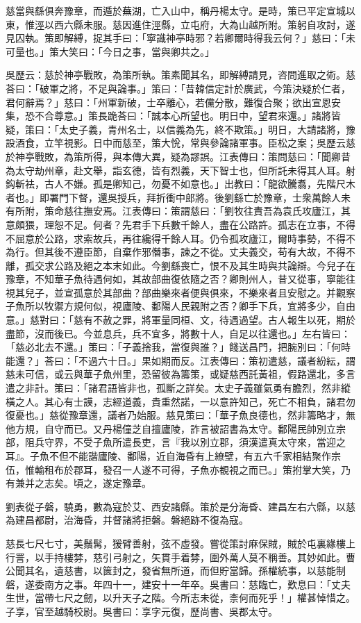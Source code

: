 \begin{pinyinscope}
慈當與繇俱奔豫章，而遁於蕪湖，亡入山中，稱丹楊太守。是時，策已平定宣城以東，惟涇以西六縣未服。慈因進住涇縣，立屯府，大為山越所附。策躬自攻討，遂見囚執。策即解縛，捉其手曰：「寧識神亭時邪？若卿爾時得我云何？」慈曰：「未可量也。」策大笑曰：「今日之事，當與卿共之。」

吳歷云：慈於神亭戰敗，為策所執。策素聞其名，即解縛請見，咨問進取之術。慈荅曰：「破軍之將，不足與論事。」策曰：「昔韓信定計於廣武，今策決疑於仁者，君何辭焉？」慈曰：「州軍新破，士卒離心，若儻分散，難復合聚；欲出宣恩安集，恐不合尊意。」策長跪荅曰：「誠本心所望也。明日中，望君來還。」諸將皆疑，策曰：「太史子義，青州名士，以信義為先，終不欺策。」明日，大請諸將，豫設酒食，立竿視影。日中而慈至，策大恱，常與參論諸軍事。臣松之案；吳歷云慈於神亭戰敗，為策所得，與本傳大異，疑為謬誤。江表傳曰：策問慈曰：「聞卿昔為太守劫州章，赴文舉，詣玄德，皆有烈義，天下智士也，但所託未得其人耳。射鈎斬袪，古人不嫌。孤是卿知己，勿憂不如意也。」出教曰：「龍欲騰翥，先階尺木者也。」即署門下督，還吳授兵，拜折衝中郎將。後劉繇亡於豫章，士衆萬餘人未有所附，策命慈往撫安焉。江表傳曰：策謂慈曰：「劉牧往責吾為袁氏攻廬江，其意頗猥，理恕不足。何者？先君手下兵數千餘人，盡在公路許。孤志在立事，不得不屈意於公路，求索故兵，再往纔得千餘人耳。仍令孤攻廬江，爾時事勢，不得不為行。但其後不遵臣節，自棄作邪僭事，諫之不從。丈夫義交，苟有大故，不得不離，孤交求公路及絕之本末如此。今劉繇喪亡，恨不及其生時與共論辯。今兒子在豫章，不知華子魚待遇何如，其故部曲復依隨之否？卿則州人，昔又從事，寧能往視其兒子，並宣孤意於其部曲？部曲樂來者便與俱來，不樂來者且安慰之。并觀察子魚所以牧禦方規何似，視廬陵、鄱陽人民親附之否？卿手下兵，宜將多少，自由意。」慈對曰：「慈有不赦之罪，將軍量同桓、文，待遇過望。古人報生以死，期於盡節，沒而後已。今並息兵，兵不宜多，將數十人，自足以往還也。」左右皆曰：「慈必北去不還。」策曰：「子義捨我，當復與誰？」餞送昌門，把腕別曰：「何時能還？」荅曰：「不過六十日。」果如期而反。江表傳曰：策初遣慈，議者紛紜，謂慈未可信，或云與華子魚州里，恐留彼為籌策，或疑慈西託黃祖，假路還北，多言遣之非計。策曰：「諸君語皆非也，孤斷之詳矣。太史子義雖氣勇有膽烈，然非縱橫之人。其心有士謨，志經道義，貴重然諾，一以意許知己，死亡不相負，諸君勿復憂也。」慈從豫章還，議者乃始服。慈見策曰：「華子魚良德也，然非籌略才，無他方規，自守而已。又丹楊僮芝自擅廬陵，詐言被詔書為太守。鄱陽民帥別立宗部，阻兵守界，不受子魚所遣長吏，言『我以別立郡，須漢遣真太守來，當迎之耳』。子魚不但不能諧廬陵、鄱陽，近自海昏有上繚壁，有五六千家相結聚作宗伍，惟輸租布於郡耳，發召一人遂不可得，子魚亦覩視之而已。」策拊掌大笑，乃有兼并之志矣。頃之，遂定豫章。

劉表從子磐，驍勇，數為寇於艾、西安諸縣。策於是分海昏、建昌左右六縣，以慈為建昌都尉，治海昏，并督諸將拒磐。磐絕跡不復為寇。

慈長七尺七寸，美鬚髯，猨臂善射，弦不虛發。嘗從策討麻保賊，賊於屯裏緣樓上行詈，以手持樓棼，慈引弓射之，矢貫手着棼，圍外萬人莫不稱善。其妙如此。曹公聞其名，遺慈書，以篋封之，發省無所道，而但貯當歸。孫權統事，以慈能制磐，遂委南方之事。年四十一，建安十一年卒。吳書曰：慈臨亡，歎息曰：「丈夫生世，當帶七尺之劒，以升天子之階。今所志未從，柰何而死乎！」權甚悼惜之。子享，官至越騎校尉。吳書曰：享字元復，歷尚書、吳郡太守。


\end{pinyinscope}